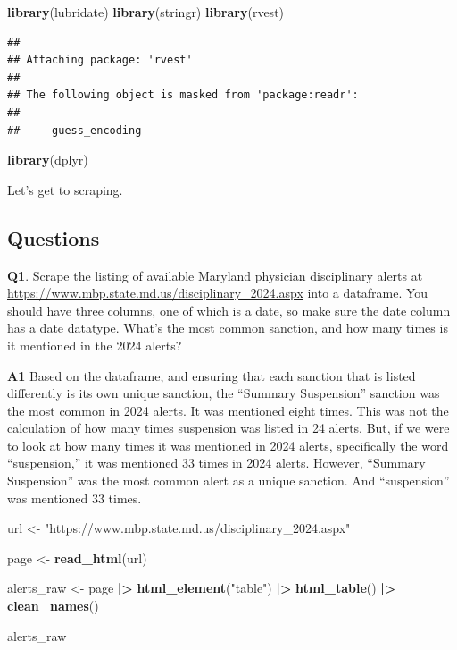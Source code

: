 \documentclass[
]{article}
\newenvironment{Shaded}{\begin{snugshade}}{\end{snugshade}}
\newcommand{\FunctionTok}[1]{\textcolor[rgb]{0.13,0.29,0.53}{\textbf{#1}}}
\newcommand{\NormalTok}[1]{#1}
\newcommand{\OtherTok}[1]{\textcolor[rgb]{0.56,0.35,0.01}{#1}}
\newcommand{\SpecialCharTok}[1]{\textcolor[rgb]{0.81,0.36,0.00}{\textbf{#1}}}
\newcommand{\StringTok}[1]{\textcolor[rgb]{0.31,0.60,0.02}{#1}}
\begin{document}
\begin{Shaded}
\begin{Highlighting}[]
\FunctionTok{library}\NormalTok{(lubridate)}
\FunctionTok{library}\NormalTok{(stringr)}
\FunctionTok{library}\NormalTok{(rvest)}
\end{Highlighting}
\end{Shaded}

\begin{verbatim}
## 
## Attaching package: 'rvest'
## 
## The following object is masked from 'package:readr':
## 
##     guess_encoding
\end{verbatim}

\begin{Shaded}
\begin{Highlighting}[]
\FunctionTok{library}\NormalTok{(dplyr)}
\end{Highlighting}
\end{Shaded}

Let's get to scraping.

\subsection{Questions}\label{questions}

\textbf{Q1}. Scrape the listing of available Maryland physician
disciplinary alerts at
\url{https://www.mbp.state.md.us/disciplinary_2024.aspx} into a
dataframe. You should have three columns, one of which is a date, so
make sure the date column has a date datatype. What's the most common
sanction, and how many times is it mentioned in the 2024 alerts?

\textbf{A1} Based on the dataframe, and ensuring that each sanction that
is listed differently is its own unique sanction, the ``Summary
Suspension'' sanction was the most common in 2024 alerts. It was
mentioned eight times. This was not the calculation of how many times
suspension was listed in 24 alerts. But, if we were to look at how many
times it was mentioned in 2024 alerts, specifically the word
``suspension,'' it was mentioned 33 times in 2024 alerts. However,
``Summary Suspension'' was the most common alert as a unique sanction.
And ``suspension'' was mentioned 33 times.

\begin{Shaded}
\begin{Highlighting}[]
\NormalTok{url }\OtherTok{\textless{}{-}} \StringTok{"https://www.mbp.state.md.us/disciplinary\_2024.aspx"}

\NormalTok{page }\OtherTok{\textless{}{-}} \FunctionTok{read\_html}\NormalTok{(url)}

\NormalTok{alerts\_raw }\OtherTok{\textless{}{-}}\NormalTok{ page }\SpecialCharTok{|\textgreater{}}
  \FunctionTok{html\_element}\NormalTok{(}\StringTok{"table"}\NormalTok{) }\SpecialCharTok{|\textgreater{}}
  \FunctionTok{html\_table}\NormalTok{() }\SpecialCharTok{|\textgreater{}}
  \FunctionTok{clean\_names}\NormalTok{()}

\NormalTok{alerts\_raw}
\end{Highlighting}
\end{Shaded}
\end{document}
